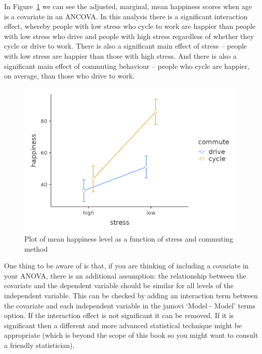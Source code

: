 \documentclass[
  a4paper,
]{book}
\begin{document}
In Figure~\ref{fig-fig14-15} we can see the adjusted, marginal, mean
happiness scores when age is a covariate in an ANCOVA. In this analysis
there is a significant interaction effect, whereby people with low
stress who cycle to work are happier than people with low stress who
drive and people with high stress regardless of whether they cycle or
drive to work. There is also a significant main effect of stress --
people with low stress are happier than those with high stress. And
there is also a significant main effect of commuting behaviour -- people
who cycle are happier, on average, than those who drive to work.

\begin{figure}

\includegraphics[width=1\textwidth,height=\textheight]{images/fig14-15.png} \hfill{}

\caption{\label{fig-fig14-15}Plot of mean happiness level as a function
of stress and commuting method}

\end{figure}

One thing to be aware of is that, if you are thinking of including a
covariate in your ANOVA, there is an additional assumption: the
relationship between the covariate and the dependent variable should be
similar for all levels of the independent variable. This can be checked
by adding an interaction term between the covariate and each independent
variable in the jamovi `Model - Model' terms option. If the interaction
effect is not significant it can be removed. If it is significant then a
different and more advanced statistical technique might be appropriate
(which is beyond the scope of this book so you might want to consult a
friendly statistician).
\end{document}
